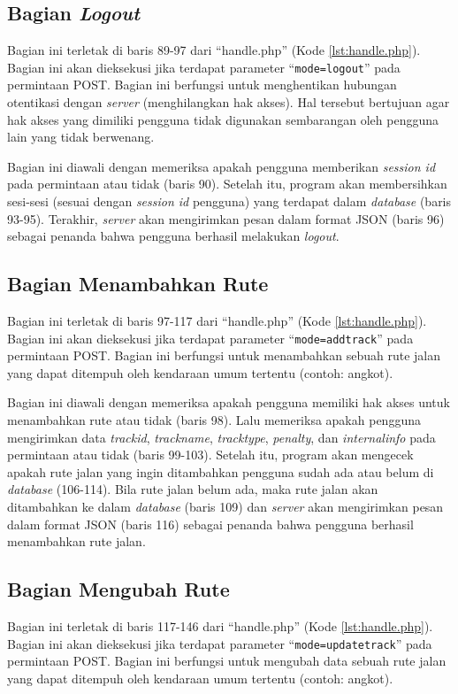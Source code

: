 \subsection{Bagian \textit{Logout}}
\label{sec:bagianlogout}
Bagian ini terletak di baris 89-97 dari ``handle.php'' (Kode \ref{lst:handle.php}). Bagian ini akan dieksekusi jika terdapat parameter ``\texttt{mode=logout}'' pada permintaan POST. Bagian ini berfungsi untuk menghentikan hubungan otentikasi dengan \textit{server} (menghilangkan hak akses). Hal tersebut bertujuan agar hak akses yang dimiliki pengguna tidak digunakan sembarangan oleh pengguna lain yang tidak berwenang.

Bagian ini diawali dengan memeriksa apakah pengguna memberikan \textit{session id} pada permintaan atau tidak (baris 90). Setelah itu, program akan membersihkan sesi-sesi (sesuai dengan \textit{session id} pengguna) yang terdapat dalam \textit{database} (baris 93-95). Terakhir, \textit{server} akan mengirimkan pesan dalam format JSON (baris 96) sebagai penanda bahwa pengguna berhasil melakukan \textit{logout}.

\subsection{Bagian Menambahkan Rute}
\label{sec:menambahkanrute}
Bagian ini terletak di baris 97-117 dari ``handle.php'' (Kode \ref{lst:handle.php}). Bagian ini akan dieksekusi jika terdapat parameter ``\texttt{mode=addtrack}'' pada permintaan POST. Bagian ini berfungsi untuk menambahkan sebuah rute jalan yang dapat ditempuh oleh kendaraan umum tertentu (contoh: angkot).

Bagian ini diawali dengan memeriksa apakah pengguna memiliki hak akses untuk menambahkan rute atau tidak (baris 98). Lalu memeriksa apakah pengguna mengirimkan data \textit{trackid}, \textit{trackname}, \textit{tracktype}, \textit{penalty}, dan \textit{internalinfo} pada permintaan atau tidak (baris 99-103). Setelah itu, program akan mengecek apakah rute jalan yang ingin ditambahkan pengguna sudah ada atau belum di \textit{database} (106-114). Bila rute jalan belum ada, maka rute jalan akan ditambahkan ke dalam \textit{database} (baris 109) dan \textit{server} akan mengirimkan pesan dalam format JSON (baris 116) sebagai penanda bahwa pengguna berhasil menambahkan rute jalan.

\subsection{Bagian Mengubah Rute}
\label{sec:mengubahrute}
Bagian ini terletak di baris 117-146 dari ``handle.php'' (Kode \ref{lst:handle.php}). Bagian ini akan dieksekusi jika terdapat parameter ``\texttt{mode=updatetrack}'' pada permintaan POST. Bagian ini berfungsi untuk mengubah data sebuah rute jalan yang dapat ditempuh oleh kendaraan umum tertentu (contoh: angkot).

